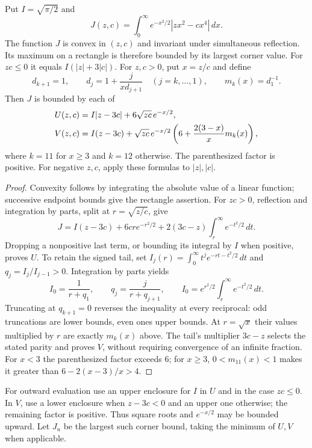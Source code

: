 \begin{lemma}
\label{j:local:entry189:mills}
Put $I=\sqrt{\pi/2}$ and
\[
 J(z,c)=\int_0^\infty e^{-x^2/2}|zx^2-cx^4|\,dx.
\]
The function $J$ is convex in $(z,c)$ and invariant under simultaneous
reflection. Its maximum on a rectangle is therefore bounded by its
largest corner value. For $zc\le0$ it equals $I(|z|+3|c|)$.
For $z,c>0$, put $x=z/c$ and define
\[
 d_{k+1}=1,\qquad d_j=1+\frac{j}{xd_{j+1}}\quad(j=k,\ldots,1),
 \qquad m_k(x)=d_1^{-1}.
\]
Then $J$ is bounded by each of
\begin{align}
 U(z,c)&=I|z-3c|+6\sqrt{zc}\,e^{-x/2},\notag\\
 V(z,c)&=I(z-3c)+\sqrt{zc}\,e^{-x/2}
       \left(6+\frac{2(3-x)}x m_k(x)\right),
 \label{j:local:entry189:mills-bound}
\end{align}
where $k=11$ for $x\ge3$ and $k=12$ otherwise. The parenthesized factor
is positive. For negative $z,c$, apply these formulas to $|z|,|c|$.
\end{lemma}
\begin{proof}
Convexity follows by integrating the absolute value of a linear function;
successive endpoint bounds give the rectangle assertion. For $zc>0$,
reflection and integration by parts, split at $r=\sqrt{z/c}$, give
\[
 J=I(z-3c)+6cr e^{-r^2/2}
       +2(3c-z)\int_r^\infty e^{-t^2/2}\,dt.
\]
Dropping a nonpositive last term, or bounding its integral by $I$ when
positive, proves $U$. To retain the signed tail, set
$I_j(r)=\int_0^\infty t^j e^{-rt-t^2/2}\,dt$ and
$q_j=I_j/I_{j-1}>0$. Integration by parts yields
\[
 I_0=\frac1{r+q_1},\qquad q_j=\frac j{r+q_{j+1}},\qquad
 I_0=e^{r^2/2}\int_r^\infty e^{-t^2/2}\,dt.
\]
Truncating at $q_{k+1}=0$ reverses the inequality at every reciprocal:
odd truncations are lower bounds, even ones upper bounds. At $r=\sqrt x$
their values multiplied by $r$ are exactly $m_k(x)$ above. The tail's
multiplier $3c-z$ selects the stated parity and proves $V$, without
requiring convergence of an infinite fraction. For $x<3$ the
parenthesized factor exceeds $6$; for $x\ge3$, $0<m_{11}(x)<1$ makes it
greater than $6-2(x-3)/x>4$.
\end{proof}

For outward evaluation use an upper enclosure for $I$ in $U$ and in
the case $zc\le0$. In $V$, use a lower enclosure when $z-3c<0$
and an upper one otherwise; the remaining factor is positive. Thus
square roots and $e^{-x/2}$ may be bounded upward. Let $J_u$ be the
largest such corner bound, taking the minimum of $U,V$ when applicable.

